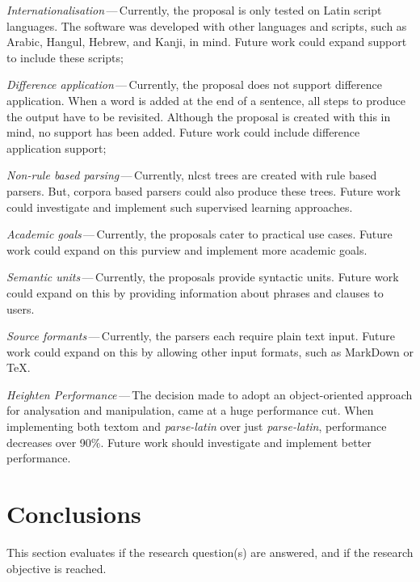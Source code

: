 \begin{aenumerate}
\item\emph{Internationalisation}\,---\,Currently, the proposal is only
    tested on Latin script languages.
  The software was developed with other languages and scripts, such as
    Arabic, Hangul, Hebrew, and Kanji, in mind.
  Future work could expand support to include these scripts;
\item\emph{Difference application}\,---\,Currently, the proposal does not
    support difference application.
  When a word is added at the end of a sentence, all steps to produce the
    output have to be revisited.
  Although the proposal is created with this in mind, no support has been
    added.
  Future work could include difference application support;
\item\emph{Non-rule based parsing}\,---\,Currently, \gls{nlcst} trees are
    created with rule based parsers.
  But, corpora based parsers could also produce these trees.
  Future work could investigate and implement such supervised learning
    approaches.
\item\emph{Academic goals}\,---\,Currently, the proposals cater to practical use
    cases.
  Future work could expand on this purview and implement more academic
    goals.
\item\emph{Semantic units}\,---\,Currently, the proposals provide syntactic
    units.
  Future work could expand on this by providing information about phrases
    and clauses to users.
\item\emph{Source formants}\,---\,Currently, the parsers each require plain
    text input.
  Future work could expand on this by allowing other input formats, such as
    MarkDown or \TeX.
\item\emph{Heighten Performance}\,---\,The decision made to adopt an
    object-oriented approach for analysation and manipulation, came at a huge
    performance cut.
  When implementing both \gls{textom} and \emph{parse-latin} over just
    \emph{parse-latin}, performance decreases over 90\%.
  Future work should investigate and implement better performance.
\end{aenumerate}

\section{Conclusions}\label{conclusions}

This section evaluates if the research question(s) are answered, and if the
  research objective is reached.

